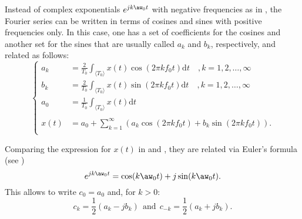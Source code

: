Instead of complex exponentials $e^{j k \aw_0 t}$ with negative frequencies as in , the Fourier series can be written in terms of cosines and sines with positive frequencies only. In this case, one has a set of coefficients for the cosines and another set for the sines that are usually called $a_k$ and $b_k$, respectively, and related as follows:
\begin{equation}
\left\{
\begin{array}{ccc}
a_k &= \frac{2}{T_0} \int_{\langle T_0\rangle} x(t) \cos(2 \pi k f_0 t) \textrm{d}t\quad,k=1,2,\ldots,\infty \\
b_k &= \frac{2}{T_0} \int_{\langle T_0\rangle} x(t) \sin(2 \pi k f_0 t) \textrm{d}t\quad,k=1,2,\ldots,\infty \\
a_0 &= \frac{1}{T_0} \int_{\langle T_0\rangle} x(t) \textrm{d}t \\
&\\
x(t) &= a_0 + \sum_{k=1}^\infty \left( a_k \cos (2 \pi k f_0 t) + b_k \sin (2 \pi k f_0 t) \right).
\label{eq:cos_sin_fourier_series}
\\ \end{array}
\right.
\end{equation}

Comparing the expression for $x(t)$ in  and , they are related via Euler's formula (see )~
\[e^{j k \aw_0 t} = \cos(k \aw_0 t) + j \sin(k \aw_0 t).\]
This allows to write $c_0 = a_0$ and, for $k > 0$:
\[
c_k = \frac{1}{2} (a_k - j b_k)~~\textrm{and}~~c_{-k} = \frac{1}{2} (a_k + j b_k).
\]


